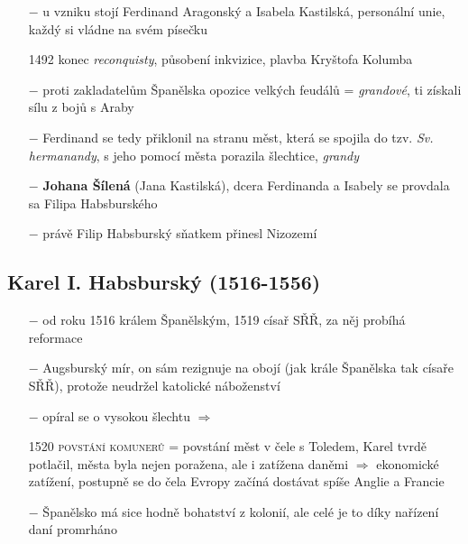\documentclass{article}
\begin{document}
\begin{itemize}
    \vspace{-0.5em}
    \setlength\itemsep{0.15em}
    \item[$-$] u vzniku stojí Ferdinand Aragonský a Isabela Kastilská, personální unie, každý si vládne na svém písečku
    \item[1492] konec \textit{reconquisty}, působení inkvizice, plavba Kryštofa Kolumba
    \item[$-$] proti zakladatelům Španělska opozice velkých feudálů = \textit{grandové}, ti získali sílu z bojů s Araby
    \item[$-$] Ferdinand se tedy přiklonil na stranu měst, která se spojila do tzv. \textit{Sv. hermanandy}, s jeho pomocí města porazila šlechtice, \textit{grandy}
    \item[$-$] \textbf{Johana Šílená} (Jana Kastilská), dcera Ferdinanda a Isabely se provdala sa Filipa Habsburského
    \item[$-$] právě Filip Habsburský sňatkem přinesl Nizozemí
\end{itemize}

\subsection*{Karel I. Habsburský (1516-1556)}
\begin{itemize}
    \vspace{-0.5em}
    \setlength\itemsep{0.15em}
    \item[$-$] od roku 1516 králem Španělským, 1519 císař SŘŘ, za něj probíhá reformace
    \item[$-$] Augsburský mír, on sám rezignuje na obojí (jak krále Španělska tak císaře SŘŘ), protože neudržel katolické náboženství
    \item[$-$] opíral se o vysokou šlechtu $\Rightarrow$
    \item[1520] \textsc{povstání komunerů} = povstání měst v čele s Toledem, Karel tvrdě potlačil, města byla nejen poražena, ale i zatížena daněmi $\Rightarrow$ ekonomické zatížení, postupně se do čela Evropy začíná dostávat spíše Anglie a Francie
    \item[$-$] Španělsko má sice hodně bohatství z kolonií, ale celé je to díky nařízení daní promrháno
\end{itemize}
\end{document}
